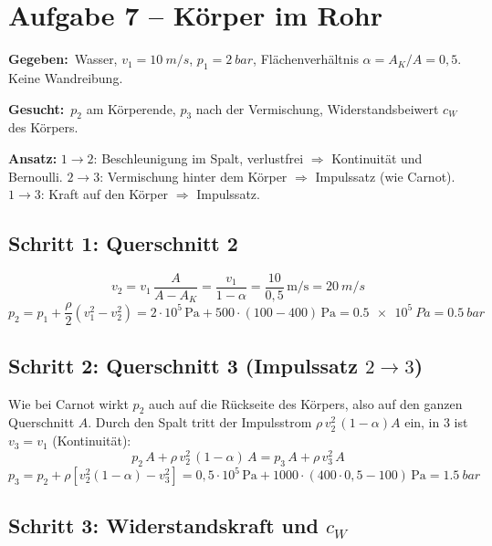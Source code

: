 \documentclass[11pt,a4paper]{article}
\newcommand{\gegeben}{\textbf{Gegeben:}\ }
\newcommand{\gesucht}{\textbf{Gesucht:}\ }
\begin{document}
\section{Aufgabe 7 -- Körper im Rohr}

\begin{bild}

\end{bild}

\gegeben Wasser, $v_1 = \SI{10}{m/s}$, $p_1 = \SI{2}{bar}$, Flächenverhältnis $\alpha = A_K/A = 0{,}5$. Keine Wandreibung.

\gesucht $p_2$ am Körperende, $p_3$ nach der Vermischung, Widerstandsbeiwert $c_W$ des Körpers.

\textbf{Ansatz:} $1 \to 2$: Beschleunigung im Spalt, verlustfrei $\Rightarrow$ Kontinuität und Bernoulli. $2 \to 3$: Vermischung hinter dem Körper $\Rightarrow$ Impulssatz (wie Carnot). $1 \to 3$: Kraft auf den Körper $\Rightarrow$ Impulssatz.

\subsection*{Schritt 1: Querschnitt 2}
\[
v_2 = v_1\,\frac{A}{A - A_K} = \frac{v_1}{1 - \alpha} = \frac{10}{0{,}5}\,\mathrm{m/s} = \SI{20}{m/s}
\]
\[
p_2 = p_1 + \frac{\rho}{2}\left(v_1^2 - v_2^2\right) = 2\cdot 10^5\,\mathrm{Pa} + 500\cdot(100 - 400)\,\mathrm{Pa} = \SI{0.5e5}{Pa} = \SI{0.5}{bar}
\]

\subsection*{Schritt 2: Querschnitt 3 (Impulssatz $2 \to 3$)}

Wie bei Carnot wirkt $p_2$ auch auf die Rückseite des Körpers, also auf den ganzen Querschnitt $A$. Durch den Spalt tritt der Impulsstrom $\rho\,v_2^2\,(1 - \alpha)A$ ein, in 3 ist $v_3 = v_1$ (Kontinuität):
\[
p_2\,A + \rho\,v_2^2\,(1 - \alpha)\,A = p_3\,A + \rho\,v_3^2\,A
\]
\[
p_3 = p_2 + \rho\left[v_2^2(1 - \alpha) - v_3^2\right] = 0{,}5\cdot 10^5\,\mathrm{Pa} + 1000\cdot(400\cdot 0{,}5 - 100)\,\mathrm{Pa} = \SI{1.5}{bar}
\]

\subsection*{Schritt 3: Widerstandskraft und $c_W$}
\end{document}
